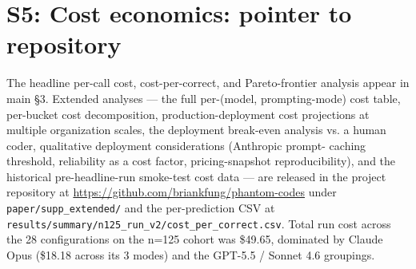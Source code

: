\section{S5: Cost economics: pointer to repository}\label{s5-cost-economics-extended-analysis}

The headline per-call cost, cost-per-correct, and Pareto-frontier
analysis appear in main §3. Extended analyses --- the full
per-(model, prompting-mode) cost table, per-bucket cost
decomposition, production-deployment cost projections at multiple
organization scales, the deployment break-even analysis vs. a human
coder, qualitative deployment considerations (Anthropic prompt-
caching threshold, reliability as a cost factor, pricing-snapshot
reproducibility), and the historical pre-headline-run smoke-test
cost data --- are released in the project repository at
\url{https://github.com/briankfung/phantom-codes} under
\texttt{paper/supp\_extended/} and the per-prediction CSV at
\texttt{results/summary/n125\_run\_v2/cost\_per\_correct.csv}.
Total run cost across the 28 configurations on the n=125 cohort was
\$49.65, dominated by Claude Opus (\$18.18 across its 3 modes) and
the GPT-5.5 / Sonnet 4.6 groupings.
